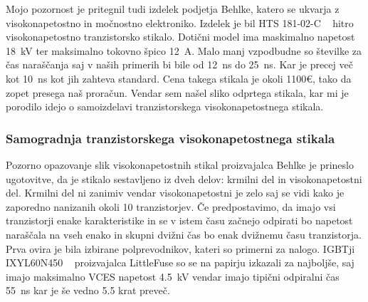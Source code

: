 \documentclass[a4paper,twoside,openright,12pt,slovene]{book}
\begin{document}
	Mojo pozornost je pritegnil tudi izdelek podjetja Behlke, katero se ukvarja z visokonapetostno in močnostno elektroniko. Izdelek je bil HTS 181-02-C ~\cite{Behlke:HTS181-02-C} hitro visokonapetostno tranzistorsko stikalo. Dotični model ima maskimalno napetost \SI{18}{\kilo\volt} ter maksimalno tokovno špico \SI{12}{\ampere}. Malo manj vzpodbudne so številke za čas naraščanja saj v naših primerih bi bile od \SI{12}{\nano\second} do \SI{25}{\nano\second}. Kar je precej več kot \SI{10}{\nano\second} kot jih zahteva standard. Cena takega stikala je okoli 1100\euro , tako da zopet presega naš proračun. Vendar sem našel sliko odprtega stikala, kar mi je porodilo idejo o samoizdelavi tranzistorskega visokonapetostnega stikala.
	
	\subsubsection{Samogradnja tranzistorskega visokonapetostnega stikala} \label{Samogradnja tranzistorskega visokonapetostnega stikala}
	
	Pozorno opazovanje slik visokonapetostnih stikal proizvajalca Behlke je prineslo ugotovitve, da je stikalo sestavljeno iz dveh delov: krmilni del in visokonapetostni del. Krmilni del ni zanimiv vendar visokonapetostni je zelo saj se vidi kako je zaporedno nanizanih okoli 10 tranzistorjev. Če predpostavimo, da imajo vsi tranzistorji enake karakteristike in se v istem času začnejo odpirati bo napetost naraščala na vseh enako in skupni dvižni čas bo enak dvižnemu času tranzistorja. Prva ovira je bila izbirane polprevodnikov, kateri so primerni za nalogo. IGBTji IXYL60N450 ~\cite{IXYS:IXYL60N450} proizvajalca LittleFuse so se na papirju izkazali za najboljše, saj imajo maksimalno VCES napetost \SI{4.5}{\kilo\volt} vendar imajo tipični odpiralni čas \SI{55}{\nano\second} kar je še vedno 5.5 krat preveč. 
\end{document}
